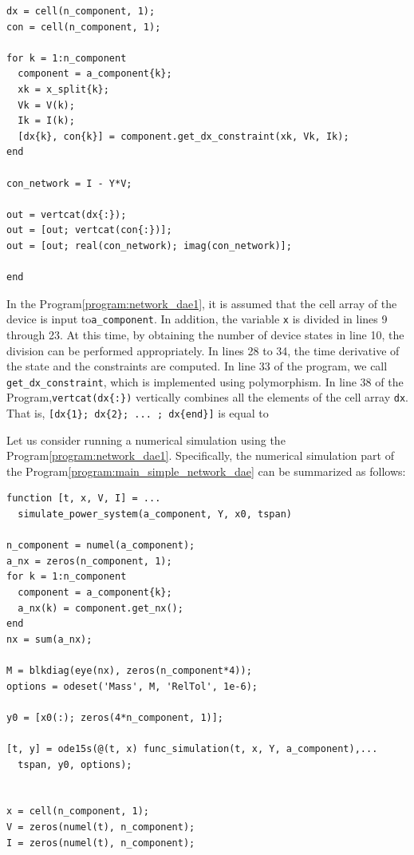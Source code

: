 \documentclass[graybox, envcountchap]{svmult}
\begin{document}
\begin{example}
\begin{PROGRAMA}[count,title={func\_simulation.m}]
\begin{verbatim}
dx = cell(n_component, 1);
con = cell(n_component, 1);

for k = 1:n_component
  component = a_component{k};
  xk = x_split{k};
  Vk = V(k);
  Ik = I(k);
  [dx{k}, con{k}] = component.get_dx_constraint(xk, Vk, Ik);
end

con_network = I - Y*V;

out = vertcat(dx{:});
out = [out; vertcat(con{:})];
out = [out; real(con_network); imag(con_network)];

end
\end{verbatim}
\end{PROGRAMA}

In the Program\nobreak\ref{program:network_dae1}, it is assumed that the cell array of the device is input to\verb|a_component|.
In addition, the variable \verb|x| is divided in lines 9 through 23.
At this time, by obtaining the number of device states in line 10, the division can be performed appropriately.
In lines 28 to 34, the time derivative of the state and the constraints are computed.
In line 33 of the program, we call \verb|get_dx_constraint|, which is implemented using polymorphism.
In line 38 of the Program,\verb|vertcat(dx{:})| vertically combines all the elements of the cell array \verb|dx|.
That is, \verb|[dx{1}; dx{2}; ... ; dx{end}]| is equal to

Let us consider running a numerical simulation using the Program\nobreak\ref{program:network_dae1}.
Specifically, the numerical simulation part of the Program\nobreak\ref{program:main_simple_network_dae} can be summarized as follows: 

\smallskip
\begin{PROGRAMA}[count,title={simulate\_power\_system.m}]\label{program:simulate_network1}
\begin{verbatim}
function [t, x, V, I] = ...
  simulate_power_system(a_component, Y, x0, tspan)

n_component = numel(a_component);
a_nx = zeros(n_component, 1);
for k = 1:n_component
  component = a_component{k};
  a_nx(k) = component.get_nx();
end
nx = sum(a_nx);

M = blkdiag(eye(nx), zeros(n_component*4));
options = odeset('Mass', M, 'RelTol', 1e-6);

y0 = [x0(:); zeros(4*n_component, 1)];

[t, y] = ode15s(@(t, x) func_simulation(t, x, Y, a_component),...
  tspan, y0, options);


x = cell(n_component, 1);
V = zeros(numel(t), n_component);
I = zeros(numel(t), n_component);


\end{verbatim}
\end{PROGRAMA}
\end{example}
\end{document}
